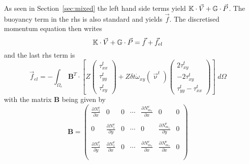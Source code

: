 As seen in Section~\ref{sec:mixed} the left hand side terms yield ${\mathbb{K}} \cdot \vec{V} + {\mathbb{G}} \cdot \vec{P}$.
The buoyancy term in the rhs is also standard and yields $\vec{f}$.
The discretised momentum equation then writes
\[
{\mathbb{K}} \cdot \vec{V} + {\mathbb{G}} \cdot \vec{P} = \vec{f} + \vec{f}_{el}
\]
and the last rhs term is 
\[
\boxed{
\vec{f}_{el} = 
-
\int_{\Omega_e} {\bm B}^T \cdot 
\left[
Z
\left(
\begin{array}{c}
{\tau}_{xx}^t\\
{\tau}_{yy}^t\\
{\tau}_{xy}^t
\end{array}
\right)
+
Z \delta t \dot{\omega}_{xy}(\vec\upnu^t)
\left(
\begin{array}{c}
 2\tau_{xy}^t \\
-2\tau_{xy}^t \\
\tau_{yy}^t-\tau^t_{xx} 
\end{array}
\right)
\right]
\; d\Omega 
}
\]
with the matrix ${\bm B}$ being given by
\[
{\bm B}=
\left(
\begin{array}{ccccccccccc}
\frac{\partial N_1^\upnu}{\partial x} & 0 & 0 &  \cdots  & \frac{\partial N_{m_v}^\upnu}{\partial x} & 0 & 0 \\ \\
0 & \frac{\partial N_1^\upnu}{\partial y} & 0 & \cdots & 0 & \frac{\partial N_{m_v}^\upnu}{\partial y} & 0 \\ \\
\frac{\partial N_1^\upnu}{\partial y} &  \frac{\partial N_1^\upnu}{\partial x} &  
0 & \cdots  &\frac{\partial N_{m_v}^\upnu}{\partial x} 
& \frac{\partial N_{m_v}^\upnu}{\partial x} & 0 \\ \\
\end{array}
\right) 
\]






